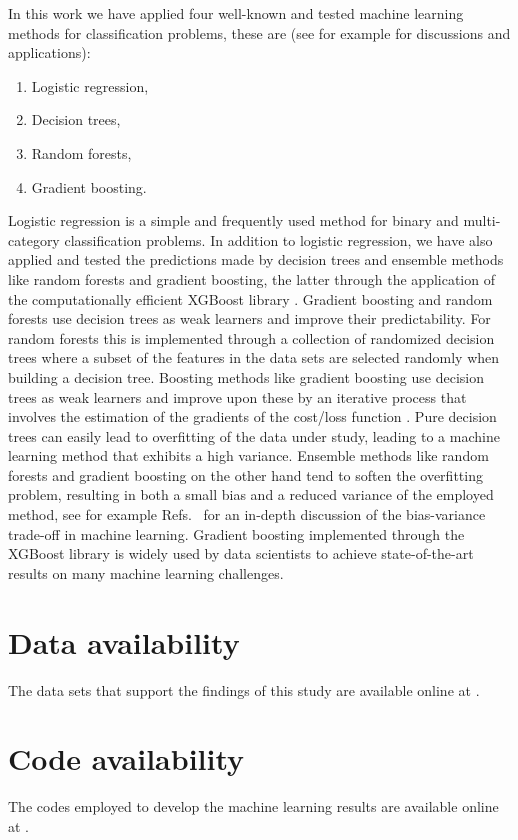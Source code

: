 \documentclass[superscriptaddress,unsortedaddress,
 amsmath,amssymb,
 aps,
]{revtex4-2}
\begin{document}
In this work we have applied four well-known and tested machine learning methods for classification problems, these are (see for example \cite{Hastie2009,Mehta2019} for discussions and applications):
\begin{enumerate}
    \item Logistic regression,
    \item Decision trees,
    \item Random forests,
    \item Gradient boosting.
\end{enumerate}
Logistic regression \cite{Hastie2009} is a simple and frequently used method for binary and multi-category classification problems. In addition to logistic regression, we have also applied and tested the predictions made by decision trees and ensemble methods like random forests and gradient boosting, the latter through the application of the computationally efficient XGBoost library \cite{xgboost2016}. Gradient boosting and random forests use decision trees as weak learners and improve their predictability. For random forests this is implemented through a collection of randomized decision trees where a  subset of the features in the data sets are selected randomly when building a decision tree. Boosting methods like gradient boosting use decision trees as  weak learners and improve upon these by an iterative process that involves the estimation of the gradients of the cost/loss function \cite{Hastie2009}. Pure decision trees can easily lead to overfitting of the data under study, leading to a machine learning method that exhibits a high variance. Ensemble methods like random forests and gradient boosting on the other hand tend to soften the overfitting problem, resulting in both a small bias and a reduced variance of the employed method, see for example Refs.~\cite{Hastie2009,Mehta2019} for an in-depth discussion of the bias-variance trade-off in machine learning. Gradient boosting implemented through the  XGBoost library \cite{xgboost2016} is widely used by data scientists to achieve state-of-the-art results on many machine learning challenges. 

\section*{Data availability} 
The data sets that support the findings of this study are available online at \cite{Ohebbi2021}.

\section*{Code availability} 
The codes employed to develop the machine learning results are available online at 
\cite{Ohebbi2021}.
\end{document}
